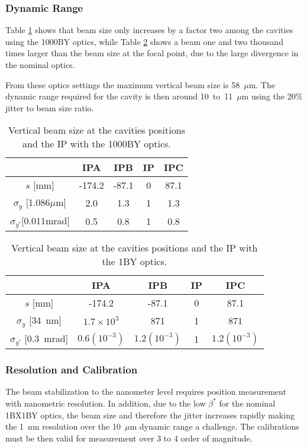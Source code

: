 \subsubsection{Dynamic Range}
Table \ref{t:sigmacavities1000BY} shows that beam size only increases by a factor two among the cavities using the 1000BY optics, while Table \ref{t:sigmacavities1BY} shows a beam one and two thousand times larger than the beam size at the focal point, due to the large divergence in the nominal optics.\par
From these optics settings the maximum vertical beam size is 58~$\mu$m. The dynamic range required for the cavity is then around 10~to~11~$\mu$m using the 20\% jitter to beam size ratio.
\begin{table}[h]
 \centering
\begin{tabular}{c||c|c|c|c}\hline
  & IPA & IPB & IP & IPC\\\hline\hline
  $s$ [mm]& -174.2 & -87.1 & 0 & 87.1 \\\hline
  $\sigma_y$ [1.086$\mu$m]&2.0&1.3&1&1.3\\\hline
  $\sigma_{y'}[0.011$mrad]&0.5&0.8&1&0.8\\\hline
\end{tabular}\caption{Vertical beam size at the cavities positions and the IP with the 1000BY optics.}\label{t:sigmacavities1000BY}
\end{table}
\begin{table}[h]
 \centering
\begin{tabular}{c||c|c|c|c}\hline
  & IPA & IPB & IP & IPC\\\hline\hline
  $s$ [mm] & -174.2 & -87.1 & 0 & 87.1\\\hline
  $\sigma_y$ [34~nm]&$1.7\times10^3$&871&1&871\\\hline
  $\sigma_{y'}$ [0.3~mrad]&$0.6(10^{-3})$&$1.2(10^{-3})$&1&$1.2(10^{-3})$\\\hline
\end{tabular}\caption{Vertical beam size at the cavities positions and the IP with the 1BY optics.}\label{t:sigmacavities1BY}
\end{table}
\subsubsection{Resolution and Calibration}
The beam stabilization to the nanometer level requires position measurement with nanometric resolution. In addition, due to the low $\beta^*$ for the nominal 1BX1BY optics, the beam size and therefore the jitter increases rapidly making the 1~nm resolution over the 10~$\mu$m dynamic range a challenge. The calibrations must be then valid for measurement over 3 to 4 order of magnitude.\par
